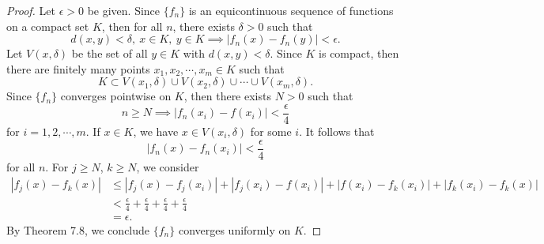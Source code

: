 \begin{Exercise}
	\begin{proof}
		Let $\epsilon > 0$ be given.
		Since $\{f_n\}$ is an equicontinuous sequence of functions on a compact set $K$, then for all $n$, there exists $\delta>0$ such that
		$$
		d(x,y)<\delta,\ x\in K,\ y\in K \implies |f_n(x) - f_n(y)| < \epsilon.
		$$
		Let $V(x,\delta)$ be the set of all $y\in K$ with $d(x,y)<\delta$.
		Since $K$ is compact, then there are finitely many points $x_1,x_2,\cdots,x_m\in K$ such that
		$$
		K\subset V(x_1,\delta)\cup V(x_2,\delta)\cup \cdots \cup V(x_m,\delta).
		$$
		Since $\{f_n\}$ converges pointwise on $K$, then there exists $N>0$ such that
		$$
		n\geq N \implies |f_n(x_i) - f(x_i)|<\frac{\epsilon}{4}
		$$
		for $i=1,2,\cdots,m$.
		If $x\in K$, we have $x\in V(x_i,\delta)$ for some $i$.
		It follows that
		$$
		|f_n(x)-f_n(x_i)|<\frac{\epsilon}{4}
		$$
		for all $n$.
		For $j\geq N$, $k\geq N$, we consider
		\begin{align*}
		|f_j(x)-f_k(x)|
		&\leq |f_j(x)-f_j(x_i)| + |f_j(x_i) - f(x_i)| + |f(x_i) - f_k(x_i)| + |f_k(x_i) - f_k(x)| \\
		&< \frac{\epsilon}{4} + \frac{\epsilon}{4} + \frac{\epsilon}{4} + \frac{\epsilon}{4} \\
		&= \epsilon.
		\end{align*}
		By Theorem 7.8, we conclude $\{f_n\}$ converges uniformly on $K$.
	\end{proof}
\end{Exercise}